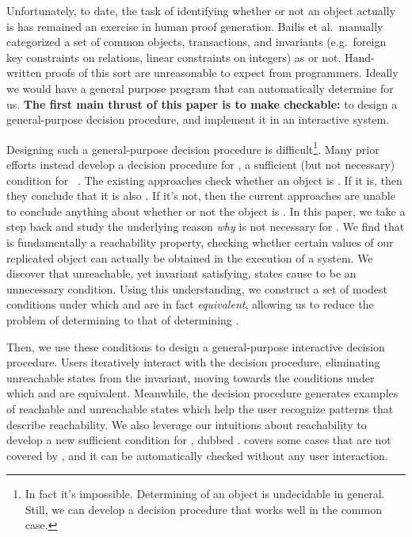 Unfortunately, to date, the task of identifying whether or not
an object actually is \invariantconfluent{} has remained an exercise in human proof generation. Bailis et al.\
manually categorized a set of common objects, transactions, and invariants
(e.g.\ foreign key constraints on relations, linear constraints on integers) as
\invariantconfluent{} or not. Hand-written proofs of this sort are unreasonable to expect from programmers. Ideally we would have a general purpose
program that can automatically determine \invariantconfluence{} for us.
\textbf{The first main thrust of this paper is to make \invariantconfluence{} checkable:} to design a general-purpose
\invariantconfluence{} decision procedure, and implement it in an interactive system.

Designing such a general-purpose decision procedure is
difficult\footnote{In fact it's impossible. Determining 
\invariantconfluence{} of an object is undecidable in general. Still, we can develop a
decision procedure that works well in the common case.}. Many prior
efforts instead develop a decision procedure for \emph{\invariantclosure{}}, a
sufficient (but not necessary) condition for
\invariantconfluence{}~\cite{li2012making, li2014automating}. The existing
approaches check whether an object is \invariantclosed{}. If it is, then they
conclude that it is also \invariantconfluent{}. If it's not, then the current
approaches are unable to conclude anything about whether or not the object is
\invariantconfluent{}. In this paper, we take a step back and study the
underlying reason \emph{why} \invariantclosure{} is not necessary for
\invariantconfluence{}. We find that \invariantconfluence{} is fundamentally a
reachability property, checking whether certain values of our replicated
object can actually be obtained in the execution of a system. We discover that
unreachable, yet invariant satisfying, states cause \invariantclosure{} to be
an unnecessary condition. Using this understanding, we construct a set of
modest conditions under which \invariantclosure{} and \invariantconfluence{}
are in fact \emph{equivalent}, allowing us to reduce the problem of determining
\invariantconfluence{} to that of determining \invariantclosure{}.

Then, we use these conditions to design a general-purpose interactive
\invariantconfluence{} decision procedure. Users iteratively interact with the
decision procedure, eliminating unreachable states from the invariant, moving
towards the conditions under which \invariantclosure{} and
\invariantconfluence{} are equivalent. Meanwhile, the decision procedure
generates examples of reachable and unreachable states which help the user
recognize patterns that describe reachability. We also leverage our intuitions
about reachability to develop a new sufficient condition for
\invariantconfluence{}, dubbed \emph{\mergereducibility}. \Mergereducibility{} covers
some cases that are not covered by \invariantclosure{}, and it can be
automatically checked without any user interaction.

